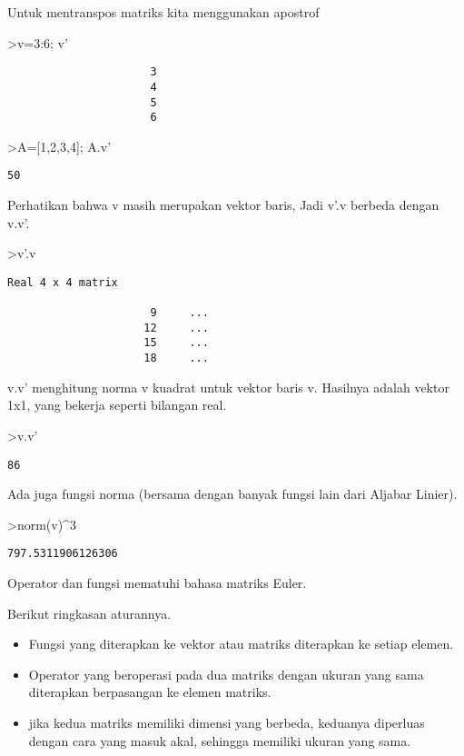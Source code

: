 \documentclass[
]{book}
\begin{document}
Untuk mentranspos matriks kita menggunakan apostrof

\textgreater v=3:6; v'

\begin{verbatim}
                      3 
                      4 
                      5 
                      6 
\end{verbatim}

\textgreater A={[}1,2,3,4{]}; A.v'

\begin{verbatim}
50
\end{verbatim}

Perhatikan bahwa v masih merupakan vektor baris, Jadi v'.v berbeda dengan v.v'.

\textgreater v'.v

\begin{verbatim}
Real 4 x 4 matrix

                      9     ...
                     12     ...
                     15     ...
                     18     ...
\end{verbatim}

v.v' menghitung norma v kuadrat untuk vektor baris v. Hasilnya adalah vektor 1x1, yang bekerja seperti bilangan real.

\textgreater v.v'

\begin{verbatim}
86
\end{verbatim}

Ada juga fungsi norma (bersama dengan banyak fungsi lain dari Aljabar Linier).

\textgreater norm(v)\^{}3

\begin{verbatim}
797.5311906126306
\end{verbatim}

Operator dan fungsi mematuhi bahasa matriks Euler.

Berikut ringkasan aturannya.

\begin{itemize}
\item
  Fungsi yang diterapkan ke vektor atau matriks diterapkan ke setiap elemen.
\item
  Operator yang beroperasi pada dua matriks dengan ukuran yang sama diterapkan berpasangan ke elemen matriks.
\item
  jika kedua matriks memiliki dimensi yang berbeda, keduanya diperluas dengan cara yang masuk akal, sehingga memiliki ukuran yang sama.
\end{itemize}
\end{document}
